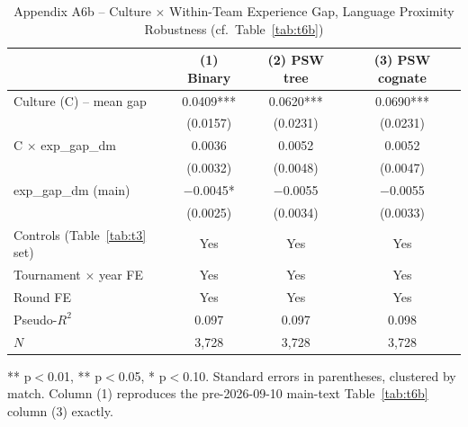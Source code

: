 \documentclass[10pt]{article}
\begin{document}
\begin{table}[htbp]
\centering
\caption{Appendix A6b -- Culture $\times$ Within-Team Experience Gap, Language Proximity Robustness (cf.\ Table~\ref{tab:t6b}) \label{tab:a6b}}
\begin{threeparttable}
\begin{tabular}{lccc}
\toprule
 & (1) Binary & (2) PSW tree & (3) PSW cognate \\
\midrule
Culture (C) -- mean gap & 0.0409*** & 0.0620*** & 0.0690*** \\
 & (0.0157) & (0.0231) & (0.0231) \\
C $\times$ exp\_gap\_dm & 0.0036 & 0.0052 & 0.0052 \\
 & (0.0032) & (0.0048) & (0.0047) \\
exp\_gap\_dm (main) & $-$0.0045* & $-$0.0055 & $-$0.0055 \\
 & (0.0025) & (0.0034) & (0.0033) \\
\midrule
Controls (Table~\ref{tab:t3} set) & Yes & Yes & Yes \\
Tournament $\times$ year FE & Yes & Yes & Yes \\
Round FE & Yes & Yes & Yes \\
Pseudo-$R^2$ & 0.097 & 0.097 & 0.098 \\
$N$ & 3,728 & 3,728 & 3,728 \\
\bottomrule
\end{tabular}
\begin{tablenotes}
\small
\item *** p$<$0.01, ** p$<$0.05, * p$<$0.10. Standard errors in parentheses, clustered by match. Column (1) reproduces the pre-2026-09-10 main-text Table~\ref{tab:t6b} column (3) exactly.
\end{tablenotes}
\end{threeparttable}
\end{table}





\end{document}
